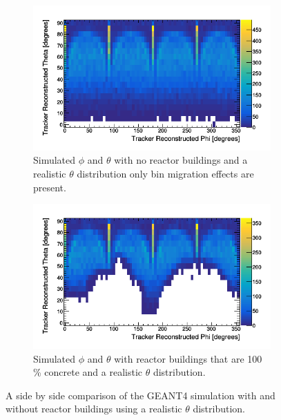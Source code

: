 \begin{figure}[!h]
\centering
\begin{subfigure}{.5\textwidth}
  \centering
  \includegraphics[width=\linewidth]{Chapter5/Figs/wylfaRasterNew/thetaVsPhiSimulatedWithReactor0.png}
  \captionsetup{width=.9\linewidth}
  \caption{Simulated $\phi$ and $\theta$ with no reactor buildings and a realistic $\theta$ distribution only bin migration effects are present.}
  \label{subFig:thetaVsPhiSimulatedWithReactor0}
\end{subfigure}%
\begin{subfigure}{.5\textwidth}
  \centering
\includegraphics[width=\linewidth]{Chapter5/Figs/wylfaRasterNew/thetaVsPhiSimulatedWithReactor100.png}
  \captionsetup{width=.9\linewidth}
  \caption{Simulated $\phi$ and $\theta$ with reactor buildings that are 100\,\% concrete and a realistic $\theta$ distribution.}
  \label{subFig:thetaVsPhiSimulatedWithReactor100}
\end{subfigure}
\caption{A side by side comparison of the GEANT4 simulation with and without reactor buildings using a realistic $\theta$ distribution.}
\label{fig:thetaVsPhiSimulatedWithReactor_0-100}
\end{figure}

